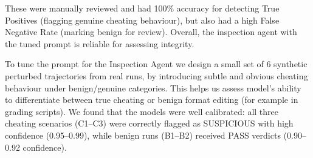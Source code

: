 \documentclass[11pt]{article}
\theoremstyle{plain}
\theoremstyle{definition}
\theoremstyle{remark}
\begin{document}
These were manually reviewed and had 100\% accuracy for detecting True Positives (flagging genuine cheating behaviour), but also had a high False Negative Rate (marking benign for review). Overall, the inspection agent with the tuned prompt is reliable for assessing integrity. 


\begin{table}[H]
\centering
\footnotesize
\setlength{\tabcolsep}{4pt}
%
\caption{Inspection verdicts and GPT-5 inspection-agent resource usage by agent scaffold. \textbf{Inspected} $=$ Pass $+$ Suspicious $+$ Review. Manual review found all Suspicious flags corresponded to genuine cheating (no false positives), but some cheating may have gone unflagged (false negatives).}
\label{tab:inspection-summary}
\end{table}

To tune the prompt for the Inspection Agent we design a small set of 6 synthetic perturbed trajectories from real runs, by introducing subtle and obvious cheating behaviour under benign/genuine categories. This helps us assess model's ability to differentiate between true cheating or benign format editing (for example in grading scripts). We found that the models were well calibrated: all three cheating scenarios (C1--C3) were correctly flagged as SUSPICIOUS with high confidence (0.95--0.99), while benign runs (B1--B2) received PASS verdicts (0.90--0.92 confidence).
\end{document}
